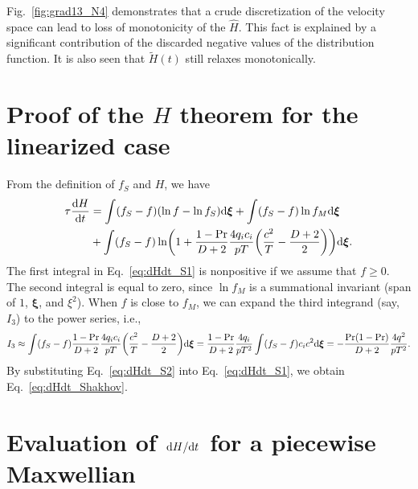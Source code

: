 \documentclass{article}
\newcommand{\bxi}{\boldsymbol{\xi}}
\begin{document}
Fig.~\ref{fig:grad13_N4} demonstrates that a crude discretization of the velocity space can lead
to loss of monotonicity of the $\hat{H}$. This fact is explained by a significant contribution
of the discarded negative values of the distribution function. It is also seen that $\tilde{H}(t)$
still relaxes monotonically.

\appendix

\section{Proof of the $H$ theorem for the linearized case}\label{sec:H_theorem}

From the definition of $f_S$ and $H$, we have
\begin{equation}\label{eq:dHdt_S1}
    \begin{aligned}
    \tau\dv{H}{t} &= \int(f_S-f)(\ln{f}-\ln{f_S})\dd\bxi + \int(f_S-f)\ln{f_M}\dd\bxi \\
    &+ \int(f_S-f)\ln(1+\frac{1-\Pr}{D+2}\frac{4q_ic_i}{pT}\qty(\frac{c^2}{T} - \frac{D+2}2))\dd\bxi.
    \end{aligned}
\end{equation}
The first integral in Eq.~\eqref{eq:dHdt_S1} is nonpositive if we assume that $f\geq0$.
The second integral is equal to zero, since $\ln{f_M}$ is a summational invariant (span of $1$, $\bxi$, and $\xi^2$).
When $f$ is close to $f_M$, we can expand the third integrand (say, $I_3$) to the power series, i.e.,
\begin{equation}\label{eq:dHdt_S2}
    I_3 \approx \int(f_S-f)\frac{1-\Pr}{D+2}\frac{4q_ic_i}{pT}\qty(\frac{c^2}{T} - \frac{D+2}2)\dd\bxi
    = \frac{1-\Pr}{D+2}\frac{4q_i}{pT^2}\int(f_S-f)c_ic^2\dd\bxi = -\frac{\Pr(1-\Pr)}{D+2}\frac{4q^2}{pT^2}.
\end{equation}
By substituting Eq.~\eqref{eq:dHdt_S2} into Eq.~\eqref{eq:dHdt_S1}, we obtain Eq.~\eqref{eq:dHdt_Shakhov}.

\section{Evaluation of $\dv*{H}{t}$ for a piecewise Maxwellian}\label{sec:violateH}
\end{document}
